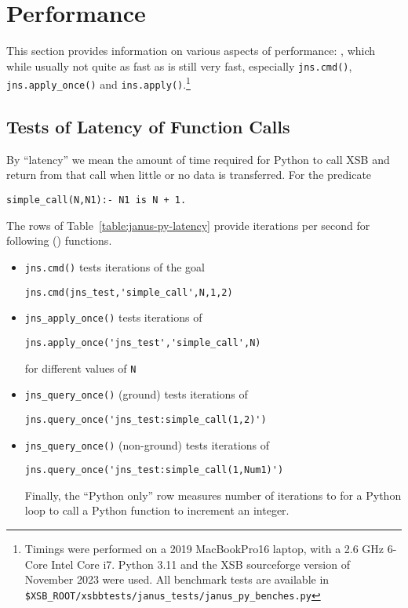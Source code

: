 \section{Performance} \label{sec:jns-perf}
%
This section provides information on various aspects of \januspy{}
performance: \januspy , which while usually not quite as fast as
\janusplg{} is still very fast, especially {\tt jns.cmd()}, {\tt
  jns.apply\_once()} and {\tt ins.apply()}.\footnote{Timings were
performed on a 2019 MacBookPro16 laptop, with a 2.6 GHz 6-Core Intel
Core i7.  Python 3.11 and the XSB sourceforge version of November 2023
were used.  All benchmark tests are available in {\tt
  \$XSB\_ROOT/xsbbtests/janus\_tests/janus\_py\_benches.py}}

\subsection{Tests of Latency of Function Calls}
By ``latency'' we mean the amount of time required for Python to call
XSB and return from that call when little or no data is transferred.
For the predicate
\begin{verbatim}
simple_call(N,N1):- N1 is N + 1.
\end{verbatim}
The rows of Table~\ref{table:janus-py-latency} provide iterations per
second for following \januspy() functions.
\begin{itemize}
\item {\tt jns.cmd()} tests iterations of the goal
\begin{verbatim}
jns.cmd(jns_test,'simple_call',N,1,2)
\end{verbatim}
\item {\tt jns\_apply\_once()} tests iterations of
\begin{verbatim}
jns.apply_once('jns_test','simple_call',N)
\end{verbatim}
for different values of {\tt N}
\item {\tt jns\_query\_once()} (ground) tests iterations of 
\begin{verbatim}
jns.query_once('jns_test:simple_call(1,2)')
\end{verbatim}
\item {\tt jns\_query\_once()} (non-ground) tests iterations of 
\begin{verbatim}
jns.query_once('jns_test:simple_call(1,Num1)')
\end{verbatim}
Finally, the ``Python only'' row measures number of iterations to for
a Python loop to call a Python function to increment an integer.
\end{itemize}

